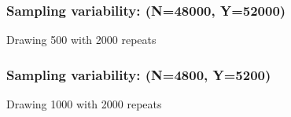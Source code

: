 \documentclass[handout]{beamer}
\begin{document}


   \begin{frame}
   \frametitle{Sampling variability: (N=48000, Y=52000)}
   \begin{center}
   \end{center}
   Drawing 500 with 2000 repeats
   \end{frame}



   \begin{frame}
   \frametitle{Sampling variability: (N=4800, Y=5200)}
   \begin{center}
   \end{center}
   Drawing 1000 with 2000 repeats
   \end{frame}

\end{document}
